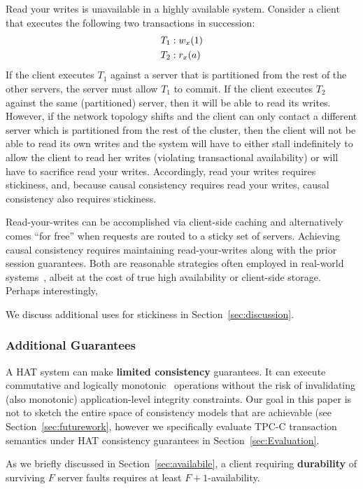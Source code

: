 Read your writes is unavailable in a highly available system. Consider
a client that executes the following two transactions in succession:
\vspace{-.5em}
\begin{align*}
\small
T_1 &: w_x(1)
\\T_2 &: r_x(a)
\end{align*}
If the client executes $T_1$ against a server that is partitioned from
the rest of the other servers, the server must allow $T_1$ to
commit. If the client executes $T_2$ against the same (partitioned)
server, then it will be able to read its writes. However, if the
network topology shifts and the client can only contact a different
server which is partitioned from the rest of the cluster, then the
client will not be able to read its own writes and the system will
have to either stall indefinitely to allow the client to read her
writes (violating transactional availability) or will have to
sacrifice read your writes. Accordingly, read your writes requires
stickiness, and, because causal consistency requires read your writes,
causal consistency also requires stickiness.

Read-your-writes can be accomplished via client-side caching and
alternatively comes ``for free'' when requests are routed to a sticky
set of servers. Achieving causal consistency requires maintaining
read-your-writes along with the prior session guarantees. Both are
reasonable strategies often employed in real-world
systems~\cite{vogels-defs}, albeit at the cost of true high
availability or client-side storage. Perhaps interestingly,  

We discuss additional uses for stickiness in Section~\ref{sec:discussion}.

\subsubsection{Additional Guarantees}

A HAT system can make \textbf{limited consistency} guarantees. It can
execute commutative and logically monotonic~\cite{needed} operations
without the risk of invalidating (also monotonic) application-level
integrity constraints. Our goal in this paper is not to sketch the
entire space of consistency models that are achievable (see
Section~\ref{sec:futurework}, however we specifically evaluate TPC-C
transaction semantics under HAT consistency guarantees in
Section~\ref{sec:Evaluation}.

As we briefly discussed in Section~\ref{sec:availabile}, a client
requiring \textbf{durability} of surviving $F$ server faults requires
at least $F+1$-availability.

